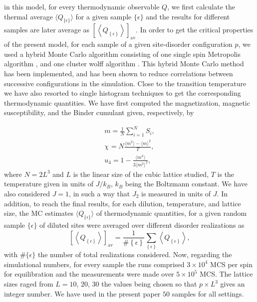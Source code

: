 \documentclass[twocolumn,5p,12pt]{elsarticle}
\begin{document}
in this model, for every thermodynamic observable $Q$, we first calculate the thermal average $\langle Q_{\{\epsilon\}} \rangle$ for a given sample $\{\epsilon \}$ and the results for different samples are later average as $\left[ {\left\langle {Q_{\left\{ \epsilon \right\}} } \right\rangle }\right]_{{\text{av}}}$. In order to get the critical properties of the present model, for each sample of a given site-disorder configuration $p$, we used a hybrid Monte Carlo algorithm consisting of one single spin Metropolis algorithm \cite{newman1999monte}, and one cluster wolff algorithm \cite{wolff1989collective} . This hybrid Monte Carlo method~\cite{creutz, pawig} has been implemented, and has been shown to reduce correlations between successive configurations in the simulation. Close to the transition temperature we have also resorted to single histogram techniques to get the corresponding thermodynamic quantities. We have first computed the magnetization, magnetic susceptibility, and the Binder cumulant given, respectively, by
%

\begin{eqnarray}
m=\frac{1}{N}\sum_{i=1}^{N}S_{i},\\
\label{mag}
\chi_{} = N \frac{\langle m^{2}\rangle -\langle m \rangle
^{2}}{T},\\
u_{4}=1-\frac{\langle m^{4}\rangle}{3\langle m^{2}\rangle^2},
\label{U1}
\end{eqnarray}
% 
where $N=2L^3$ and $L$ is the linear size of the cubic lattice studied, $T$ is the temperature given in units of $J/k_B$, $k_B$ being the Boltzmann constant. We have also considered $J=1$, in such a way that $J_2$ is measured in units of $J$.
In addition, to reach the final results, for each dilution, temperature, and lattice size, the MC estimates $\langle Q_{\{\epsilon\}} \rangle$ of thermodynamic quantities, for a given random sample  $\{\epsilon\}$ of diluted sites were averaged over different disorder realizations as
%
\begin{equation}
\left[ {\left\langle {Q_{\left\{ \epsilon  \right\}} } \right\rangle } \right]_{{\text{av}}}  = \frac{1}
{{\# \left\{ \epsilon  \right\}}}\sum\limits_{\left\{ \epsilon  \right\}} {\left\langle {Q_{\left\{ \epsilon
\right\}} } \right\rangle } ,
\label{av}
\end{equation}
%
with $\#\{\epsilon\}$ the number of total realizations considered.
Now, regarding the simulational numbers, for every sample the runs comprised $ 3 \times 10^4$ MCS per spin for equilibration and  the measurements were made over $5 \times 10^5$ MCS. The lattice sizes raged from $L=10$, $20$, $30$ the values being chosen so that $p \times L^3$ gives an integer number. We have used in the present paper $50$ samples for all settings.
\end{document}
